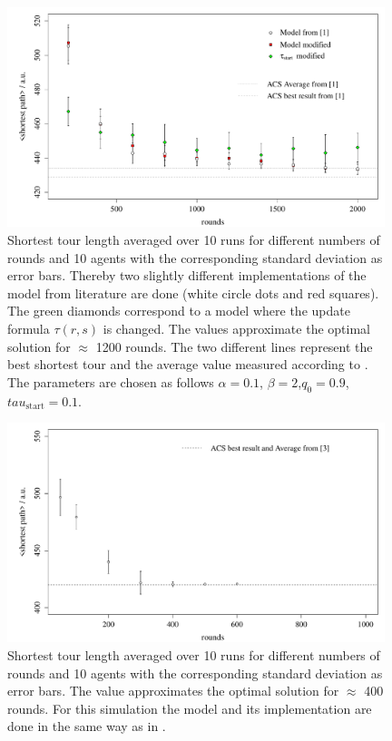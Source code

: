 \begin{figure}[h!]
\begin{center}
\includegraphics[width=11cm, height= 6 cm]{rounds_vs_shortestpath_eil}
\caption{Shortest tour length averaged over 10 runs for different numbers of rounds and 10 agents with the corresponding standard deviation as error bars. Thereby two slightly different implementations of the model from literature \cite{paper} are done (white circle dots and red squares). The green diamonds correspond to a model where the update formula $\tau(r,s)$ is changed. The values approximate the optimal solution for $\approx$ 1200 rounds. The two different lines represent the best shortest tour and the average value measured according to \cite{paper}. The parameters are chosen as follows $\alpha=0.1$, $\beta=2$,$q_0=0.9$,$tau_\text{start}=0.1$.}
\label{fig:roundspeil}
\end{center}
\end{figure}


\begin{figure}[h!]
\begin{center}
\includegraphics[width=11cm, height= 6 cm]{rounds_vs_shortestpath_oli}
\caption{Shortest tour length averaged over 10 runs for different numbers of rounds and 10 agents with the corresponding standard deviation as error bars. The value approximates the optimal solution for $\approx$ 400 rounds. For this simulation the model and its implementation are done in the same way as in \cite{paper}.}
\label{fig:roundspoli}
\end{center}
\end{figure}



